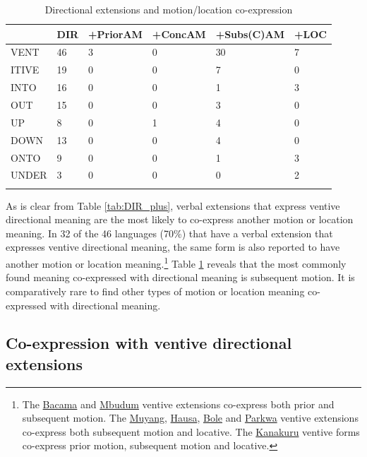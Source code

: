 \begin{table}
	\caption{Directional extensions and motion/location co-expression}
	\label{tab:DR_plusTABLE2}
	\begin{tabular}{llllll} %
		\lsptoprule
		{} &  DIR &  +PriorAM &  +ConcAM &  +Subs(C)AM &  +LOC \\
		\midrule
		VENT &   46 &        3 &       0 &         30 &    7 \\
		ITIVE &   19 &        0 &       0 &          7 &    0 \\
		INTO &   16 &        0 &       0 &          1 &    3 \\
		OUT &   15 &        0 &       0 &          3 &    0 \\
		UP &    8 &        0 &       1 &          4 &    0 \\
		DOWN &   13 &        0 &       0 &          4 &    0 \\
		ONTO &    9 &        0 &       0 &          1 &    3 \\
		UNDER &    3 &        0 &       0 &          0 &    2 \\
		\lspbottomrule
	\end{tabular}
\end{table}

As is clear from Table \ref{tab:DIR_plus}, verbal extensions that express ventive directional meaning are the most likely to co-express another motion or location meaning. In 32 of the 46 languages (70\%) that have a verbal extension that expresses ventive directional meaning, the same form is also reported to have another motion or location meaning.\footnote{The \hyperref[baca]{Bacama} and \hyperref[mbud]{Mbudum} ventive extensions co-express both prior and subsequent motion. The \hyperref[muya]{Muyang}, \hyperref[haus]{Hausa}, \hyperref[bole]{Bole} and \hyperref[park]{Parkwa} ventive extensions co-express both subsequent motion and locative. The \hyperref[kana]{Kanakuru} ventive forms co-express prior motion, subsequent motion and locative.} Table \ref{tab:DR_plusTABLE2} reveals that the most commonly found meaning co-expressed with directional meaning is subsequent motion. It is comparatively rare to find other types of motion or location meaning co-expressed with directional meaning.

\subsection{Co-expression with ventive directional extensions} \label{sec:covent2}

